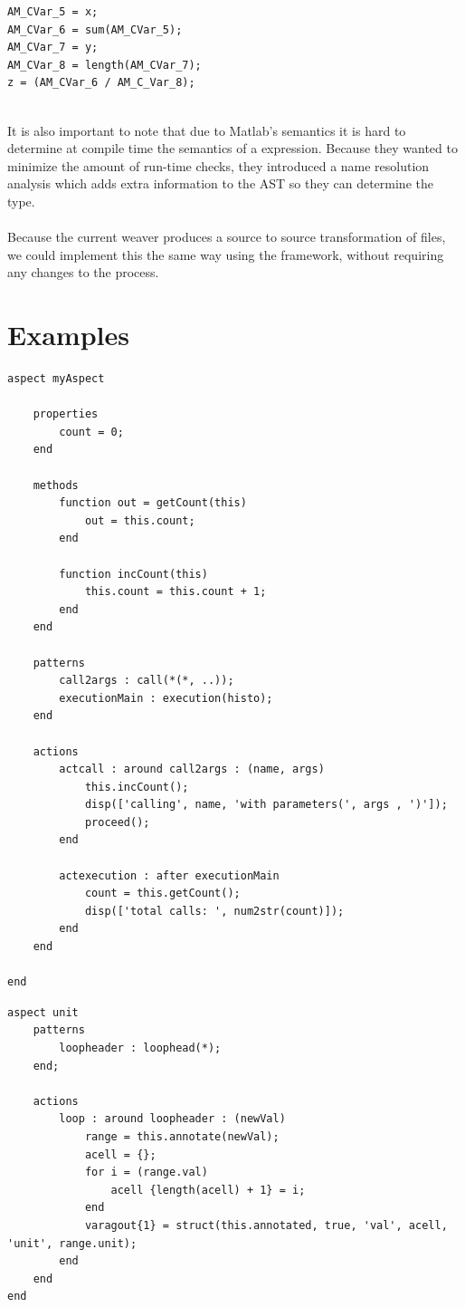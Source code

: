 \documentclass[a4paper]{report}
\begin{document}
\begin{minipage}{0.45\textwidth}
\begin{lstlisting}[caption=Resulting code.]
AM_CVar_5 = x;
AM_CVar_6 = sum(AM_CVar_5);
AM_CVar_7 = y;
AM_CVar_8 = length(AM_CVar_7);
z = (AM_CVar_6 / AM_C_Var_8);
\end{lstlisting}
\end{minipage}
\\
It is also important to note that due to Matlab's semantics it is hard to determine at compile time the semantics of a expression. Because they wanted to minimize the amount of run-time checks, they introduced a name resolution analysis which adds extra information to the AST so they can determine the type.\\
\\
Because the current weaver produces a source to source transformation of files, we could implement this the same way using the framework, without requiring any changes to the process.

\section{Examples}
\begin{lstlisting}[caption=An aspect to count all calls made with at least 2 arguments., label=lst:Matlab_ExampleCalls]
aspect myAspect

	properties
		count = 0;
	end

	methods
		function out = getCount(this)
			out = this.count;
		end

		function incCount(this)
			this.count = this.count + 1;
		end
	end

	patterns
		call2args : call(*(*, ..));
		executionMain : execution(histo);
	end

	actions
		actcall : around call2args : (name, args)
			this.incCount();
			disp(['calling', name, 'with parameters(', args , ')']);
			proceed();
		end
		
		actexecution : after executionMain
			count = this.getCount();
			disp(['total calls: ', num2str(count)]);
		end
	end

end
\end{lstlisting}
\begin{lstlisting}[caption=Example of a units aspect., label=Matlab_ExampleUnits]
aspect unit
	patterns
		loopheader : loophead(*);
	end;
	
	actions
		loop : around loopheader : (newVal)
			range = this.annotate(newVal);
			acell = {};
			for i = (range.val)
				acell {length(acell) + 1} = i;
			end
			varagout{1} = struct(this.annotated, true, 'val', acell, 'unit', range.unit);
		end
	end
end
\end{lstlisting}
\end{document}
